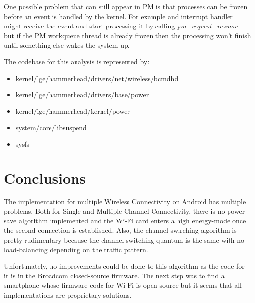 One possible problem that can still appear in PM is that processes can be frozen before an event is handled by the kernel. For example and interrupt handler might receive the event and start processing it by calling \textit {pm_request_resume} - but if the PM workqueue thread is already frozen then the processing won't finish until something else wakes the system up.

The codebase for this analysis is represented by:
\begin{itemize}
  \item kernel/lge/hammerhead/drivers/net/wireless/bcmdhd
  \item kernel/lge/hammerhead/drivers/base/power
  \item kernel/lge/hammerhead/kernel/power
  \item system/core/libsuspend
  \item sysfs
\end{itemize}

\section{Conclusions}
\label{sec:conclusions}

The implementation for multiple Wireless Connectivity on Android has multiple problems. Both for Single and Multiple Channel Connectivity, there is no power save algorithm implemented and the Wi-Fi card enters a high energy-mode once the second connection is established. Also, the channel swirching algorithm is pretty rudimentary because the channel switching quantum is the same with no load-balancing depending on the traffic pattern. 

Unfortunately, no improvements could be done to this algorithm as the code for it is in the Broadcom closed-source firmware. The next step was to find a smartphone whose firmware code for Wi-Fi is open-source but it seems that all implementations are proprietary solutions.

 

 









